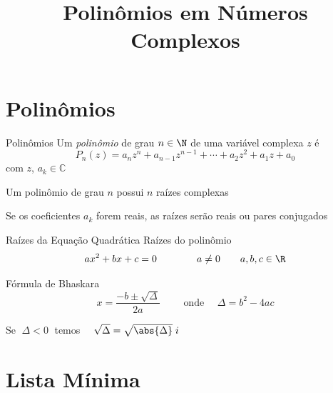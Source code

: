 
\usepackage{calculo_varias_variaveis-1}

\title{Polinômios em Números Complexos}



\addtitle

\section{Polinômios}

\begin{frame}{Polinômios}
  Um \emph{polinômio} de grau $n\in\N$ de uma variável complexa $z$ \pause é
  \[
    P_n(z)
    = a_n z^n
    + a_{n-1} z^{n-1}
    + \cdots
    + a_2 z^2
    + a_1 z
    + a_0
  \]
  com \(z\), \(a_k\in\mathbb{C}\)

  \pause
  \vspace{\baselineskip}
  Um polinômio de grau $n$ possui $n$ raízes complexas

  \pause
  \vspace{\baselineskip}
  Se os coeficientes \(a_k\) forem reais, as raízes serão reais ou pares conjugados
\end{frame}

\begin{frame}{Raízes da Equação Quadrática}
  Raízes do polinômio
  \[
    ax^2 + bx + c = 0
    \qquad\qquad
    a\neq 0
    \qquad
    a, b, c \in \R
  \]

  \pause
  Fórmula de Bhaskara
  \[
    x = \dfrac{\displaystyle -b \pm \sqrt{\Delta}}{2a}
    \qquad\text{ onde }\quad
    \Delta = b^2 - 4 ac
  \]

  \pause
  Se \(\;\Delta<0\;\) temos
  \(\quad \sqrt{\Delta} = \sqrt{\abs{\Delta}}\;i \)
\end{frame}




\section{Lista Mínima}

